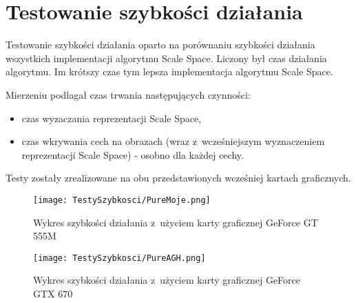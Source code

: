 \section{Testowanie szybkości działania}
\label{sec:testSzybkosci}

Testowanie szybkości działania oparto na porównaniu szybkości działania wszystkich implementacji algorytmu Scale Space. Liczony był czas działania algorytmu. Im krótszy czas tym lepsza implementacja algorytmu Scale Space.

Mierzeniu podlagał czas trwania następujących czynności:
\begin{itemize}
\item czas wyzaczania reprezentacji Scale Space,
\item czas wkrywania cech na obrazach (wraz z~wcześniejszym wyznaczeniem reprezentacji Scale Space) - osobno dla każdej cechy.
\end{itemize}

Testy zostały zrealizowane na obu przedstawionych wcześniej kartach graficznych.

\begin{figure}[h]
\begin{center}
\texttt{[image: TestySzybkosci/PureMoje.png]}
\end{center}
\caption{Wykres szybkości działania z~użyciem karty graficznej GeForce GT 555M}
\label{fig:pureSzybkoscMoje}
\end{figure}

\begin{figure}[h]
\begin{center}
\texttt{[image: TestySzybkosci/PureAGH.png]}
\end{center}
\caption{Wykres szybkości działania z~użyciem karty graficznej GeForce GTX 670}
\label{fig:pureSzybkoscAGH}
\end{figure}

